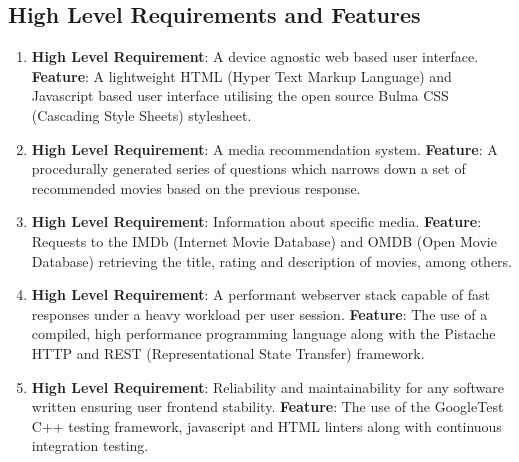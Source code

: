 \documentclass{article}
\begin{document}
\subsection{High Level Requirements and Features}
\begin{enumerate}
\item
\textbf{High Level Requirement}: A device agnostic web based user interface.
\newline
\textbf{Feature}: A lightweight HTML (Hyper Text Markup Language) and Javascript
based user interface utilising the open source Bulma CSS (Cascading Style Sheets)
stylesheet.
\item 
\textbf{High Level Requirement}: A media recommendation system.\newline
\textbf{Feature}: A procedurally generated series of questions which narrows
down a set of recommended movies based on the previous response.
\item 
\textbf{High Level Requirement}: Information about specific media. \newline
\textbf{Feature}: Requests to the IMDb (Internet Movie Database) and OMDB
(Open Movie Database) retrieving the title, rating and description of movies,
among others.
\item
\textbf{High Level Requirement}: A performant webserver stack capable of fast
responses under a heavy workload per user session.\newline
\textbf{Feature}: The use of a compiled, high performance programming language
along with the Pistache HTTP and REST (Representational State Transfer)
framework.
\item
\textbf{High Level Requirement}: Reliability and maintainability for any 
software written ensuring user frontend stability.\newline
\textbf{Feature}:
The use of the GoogleTest C++ testing framework, javascript and HTML linters
along with continuous integration testing.
\end{enumerate}
\end{document}
